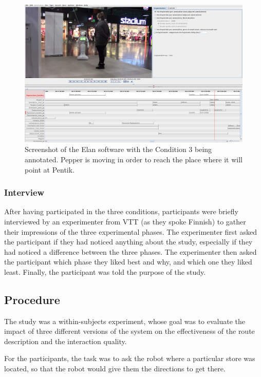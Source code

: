 \documentclass[a4paper,11pt,twoside]{StyleThese}
\begin{document}
\begin{figure}[ht!b]
	\centering
	\includegraphics[width=\linewidth]{figures/chapter3/elan.png}
	\caption{Screenshot of the Elan software with the Condition 3 being annotated. Pepper is moving in order to reach the place where it will point at Pentik.}
	\label{chap8:fig:elan}
\end{figure}

\subsubsection{Interview}

After having participated in the three conditions, participants were briefly interviewed by an experimenter from VTT (as they spoke Finnish) to gather their impressions of the three experimental phases. The experimenter first asked the participant if they had noticed anything about the study, especially if they had noticed a difference between the three phases. The experimenter then asked the participant which phase they liked best and why, and which one they liked least. Finally, the participant was told the purpose of the study.


\subsection{Procedure}
The study was a within-subjects experiment, whose goal was to evaluate the impact of three different versions of the system on the effectiveness of the route description and the interaction quality. 

For the participants, the task was to ask the robot where a particular store was located, so that the robot would give them the directions to get there.
\end{document}
